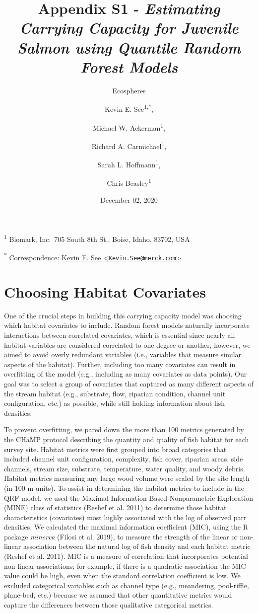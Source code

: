 \documentclass[
  12pt,
]{article}
\title{Appendix S1 - \emph{Estimating Carrying Capacity for Juvenile Salmon using Quantile Random Forest Models}}
\subtitle{Ecospheres}
\author{Kevin E. See\textsuperscript{1,*}, 
    \and Michael W. Ackerman\textsuperscript{1}, 
    \and Richard A. Carmichael\textsuperscript{1},
    \and Sarah L. Hoffmann\textsuperscript{1}, 
    \and Chris Beasley\textsuperscript{1}}
\date{December 02, 2020}
\begin{document}
\maketitle

\textsuperscript{1} Biomark, Inc.~705 South 8th St., Boise, Idaho, 83702, USA

\textsuperscript{*} Correspondence: \href{mailto:Kevin.See@merck.com}{Kevin E. See \textless{}\href{mailto:Kevin.See@merck.com}{\nolinkurl{Kevin.See@merck.com}}\textgreater{}}

\hypertarget{choosing-habitat-covariates}{%
\section{Choosing Habitat Covariates}\label{choosing-habitat-covariates}}

One of the crucial steps in building this carrying capacity model was choosing which habitat covariates to include. Random forest models naturally incorporate interactions between correlated covariates, which is essential since nearly all habitat variables are considered correlated to one degree or another, however, we aimed to avoid overly redundant variables (i.e., variables that measure similar aspects of the habitat). Further, including too many covariates can result in overfitting of the model (e.g., including as many covariates as data points). Our goal was to select a group of covariates that captured as many different aspects of the stream habitat (e.g., substrate, flow, riparian condition, channel unit configuration, etc.) as possible, while still holding information about fish densities.

To prevent overfitting, we pared down the more than 100 metrics generated by the CHaMP protocol describing the quantity and quality of fish habitat for each survey site. Habitat metrics were first grouped into broad categories that included channel unit configuration, complexity, fish cover, riparian areas, side channels, stream size, substrate, temperature, water quality, and woody debris. Habitat metrics measuring any large wood volume were scaled by the site length (in 100 m units). To assist in determining the habitat metrics to include in the QRF model, we used the Maximal Information-Based Nonparametric Exploration (MINE) class of statistics (Reshef et al. 2011) to determine those habitat characteristics (covariates) most highly associated with the log of observed parr densities. We calculated the maximal information coefficient (MIC), using the R package \emph{minerva} (Filosi et al. 2019), to measure the strength of the linear or non-linear association between the natural log of fish density and each habitat metric (Reshef et al. 2011). MIC is a measure of correlation that incorporates potential non-linear associations; for example, if there is a quadratic association the MIC value could be high, even when the standard correlation coefficient is low. We excluded categorical variables such as channel type (e.g., meandering, pool-riffle, plane-bed, etc.) because we assumed that other quantitative metrics would capture the differences between those qualitative categorical metrics.
\end{document}
